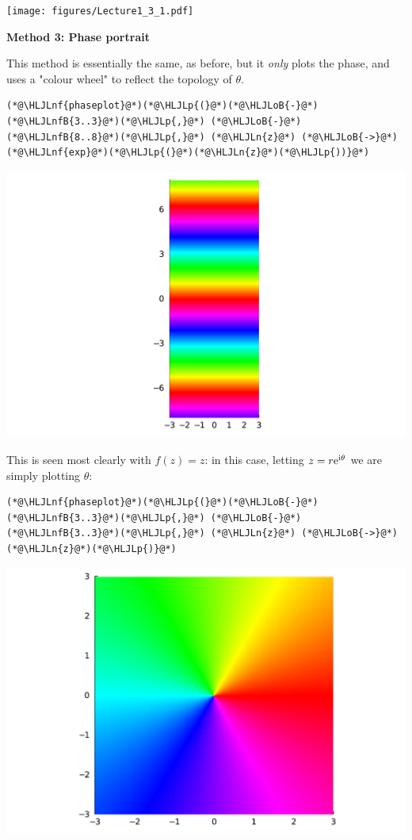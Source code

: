 \documentclass[12pt,a4paper]{article}
\newcommand{\HLJLn}[1]{#1}
\newcommand{\HLJLnf}[1]{\textcolor[RGB]{66,102,213}{#1}}
\newcommand{\HLJLnfB}[1]{\textcolor[RGB]{59,151,46}{#1}}
\newcommand{\HLJLoB}[1]{\textcolor[RGB]{102,102,102}{\textbf{#1}}}
\newcommand{\HLJLp}[1]{#1}
\def\I{ {\rm i} }
\def\E{ {\rm e} }
\begin{document}
\texttt{[image: figures/Lecture1\_3\_1.pdf]}

\textbf{Method 3: Phase portrait}

This method is essentially the same, as before, but it \emph{only} plots the phase, and uses a "colour wheel" to reflect the topology of $\theta$.


\begin{lstlisting}
(*@\HLJLnf{phaseplot}@*)(*@\HLJLp{(}@*)(*@\HLJLoB{-}@*)(*@\HLJLnfB{3..3}@*)(*@\HLJLp{,}@*) (*@\HLJLoB{-}@*)(*@\HLJLnfB{8..8}@*)(*@\HLJLp{,}@*) (*@\HLJLn{z}@*) (*@\HLJLoB{->}@*) (*@\HLJLnf{exp}@*)(*@\HLJLp{(}@*)(*@\HLJLn{z}@*)(*@\HLJLp{))}@*)
\end{lstlisting}

\includegraphics[width=\linewidth]{figures/Lecture1_4_1.pdf}

This is seen most clearly with $f(z) = z$: in this case, letting $z = r \E^{\I \theta}$ we are simply plotting $\theta$:


\begin{lstlisting}
(*@\HLJLnf{phaseplot}@*)(*@\HLJLp{(}@*)(*@\HLJLoB{-}@*)(*@\HLJLnfB{3..3}@*)(*@\HLJLp{,}@*) (*@\HLJLoB{-}@*)(*@\HLJLnfB{3..3}@*)(*@\HLJLp{,}@*) (*@\HLJLn{z}@*) (*@\HLJLoB{->}@*) (*@\HLJLn{z}@*)(*@\HLJLp{)}@*)
\end{lstlisting}

\includegraphics[width=\linewidth]{figures/Lecture1_5_1.pdf}
\end{document}
